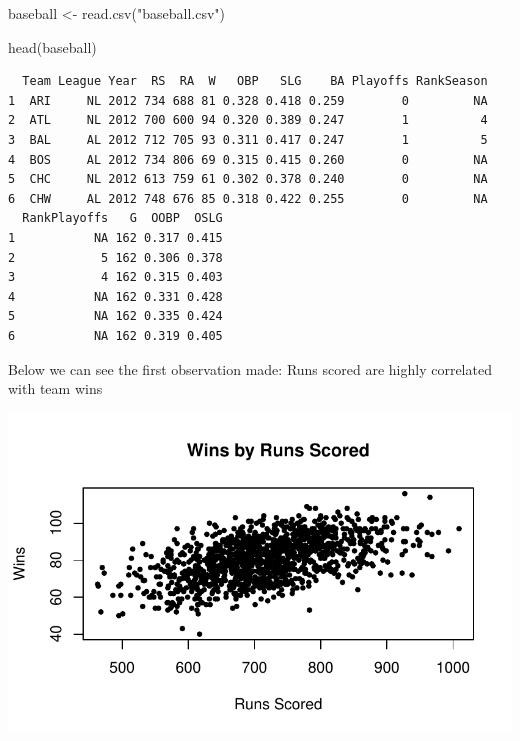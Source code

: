 \documentclass[
  letterpaper,
  DIV=11,
  numbers=noendperiod]{scrreprt}
\newenvironment{Shaded}{\begin{snugshade}}{\end{snugshade}}
\newcommand{\FunctionTok}[1]{\textcolor[rgb]{0.28,0.35,0.67}{#1}}
\newcommand{\NormalTok}[1]{\textcolor[rgb]{0.00,0.23,0.31}{#1}}
\newcommand{\OtherTok}[1]{\textcolor[rgb]{0.00,0.23,0.31}{#1}}
\newcommand{\StringTok}[1]{\textcolor[rgb]{0.13,0.47,0.30}{#1}}
\begin{document}
\begin{Shaded}
\begin{Highlighting}[]
\NormalTok{baseball }\OtherTok{\textless{}{-}} \FunctionTok{read.csv}\NormalTok{(}\StringTok{"baseball.csv"}\NormalTok{)}
\end{Highlighting}
\end{Shaded}

\begin{Shaded}
\begin{Highlighting}[]
\FunctionTok{head}\NormalTok{(baseball)}
\end{Highlighting}
\end{Shaded}

\begin{verbatim}
  Team League Year  RS  RA  W   OBP   SLG    BA Playoffs RankSeason
1  ARI     NL 2012 734 688 81 0.328 0.418 0.259        0         NA
2  ATL     NL 2012 700 600 94 0.320 0.389 0.247        1          4
3  BAL     AL 2012 712 705 93 0.311 0.417 0.247        1          5
4  BOS     AL 2012 734 806 69 0.315 0.415 0.260        0         NA
5  CHC     NL 2012 613 759 61 0.302 0.378 0.240        0         NA
6  CHW     AL 2012 748 676 85 0.318 0.422 0.255        0         NA
  RankPlayoffs   G  OOBP  OSLG
1           NA 162 0.317 0.415
2            5 162 0.306 0.378
3            4 162 0.315 0.403
4           NA 162 0.331 0.428
5           NA 162 0.335 0.424
6           NA 162 0.319 0.405
\end{verbatim}

Below we can see the first observation made: Runs scored are highly
correlated with team wins

\includegraphics{08-Regression_files/figure-pdf/unnamed-chunk-4-1.pdf}
\end{document}

